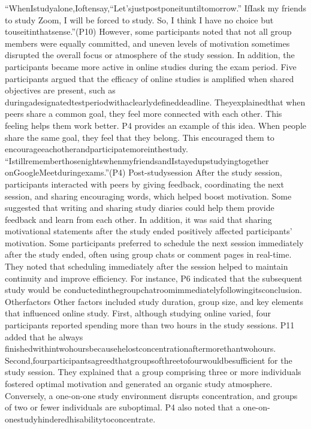 \documentclass[12pt]{ctexart}
\begin{document}
“WhenIstudyalone,Ioftensay,“Let’sjustpostponeituntiltomorrow.” IfIask
my friends to study Zoom, I will be forced to study. So, I think I have no choice but
touseitinthatsense.”(P10)
However, some participants noted that not all group members were equally
committed, and uneven levels of motivation sometimes disrupted the overall focus
or atmosphere of the study session. In addition, the participants became more
active in online studies during the exam period. Five participants argued that the
efficacy of online studies is amplified when shared objectives are present, such as
duringadesignatedtestperiodwithaclearlydefineddeadline. Theyexplainedthat
when peers share a common goal, they feel more connected with each other. This
feeling helps them work better. P4 provides an example of this idea. When people
share the same goal, they feel that they belong. This encouraged them to
encourageeachotherandparticipatemoreinthestudy.
“IstillrememberthosenightswhenmyfriendsandIstayedupstudyingtogether
onGoogleMeetduringexams.”(P4)
Post-studysession
After the study session, participants interacted with peers by giving feedback,
coordinating the next session, and sharing encouraging words, which helped boost
motivation. Some suggested that writing and sharing study diaries could help them
provide feedback and learn from each other. In addition, it was said that sharing
motivational statements after the study ended positively affected participants’
motivation.
Some participants preferred to schedule the next session immediately after the
study ended, often using group chats or comment pages in real-time. They noted
that scheduling immediately after the session helped to maintain continuity and
improve efficiency. For instance, P6 indicated that the subsequent study would be
conductedinthegroupchatroomimmediatelyfollowingitsconclusion.
Otherfactors
Other factors included study duration, group size, and key elements that influenced
online study. First, although studying online varied, four participants reported
spending more than two hours in the study sessions. P11 added that he always
finishedwithintwohoursbecausehelostconcentrationaftermorethantwohours.
Second,fourparticipantsagreedthatgroupsofthreetofourwouldbesufficient
for the study session. They explained that a group comprising three or more
individuals fostered optimal motivation and generated an organic study
atmosphere. Conversely, a one-on-one study environment disrupts concentration,
and groups of two or fewer individuals are suboptimal. P4 also noted that a
one-on-onestudyhinderedhisabilitytoconcentrate.
\end{document}
